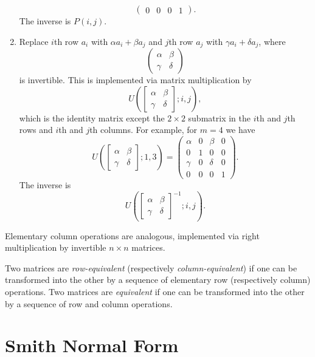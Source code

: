 \begin{enumerate}
\[\begin{pmatrix}
        0 & 0 & 0 & 1
      \end{pmatrix}.
    \]
    The inverse is $P(i, j)$.
  \item Replace $i$th row $a_i$ with
    $\alpha a_i + \beta a_j$ and $j$th row $a_j$ with
    $\gamma a_i + \delta a_j$, where
    \[
      \begin{pmatrix}
        \alpha & \beta \\
        \gamma & \delta
      \end{pmatrix}
    \]
    is invertible. This is implemented via matrix
    multiplication by
    \[
      U\left(\begin{bmatrix} \alpha & \beta \\ \gamma & \delta \end{bmatrix}; i, j\right),
    \]
    which is the identity matrix except the
    $2 \times 2$ submatrix in the $i$th and $j$th
    rows and $i$th and $j$th columns. For example, for
    $m = 4$ we have
    \[
      U\left(\begin{bmatrix} \alpha & \beta \\ \gamma & \delta \end{bmatrix}; 1, 3\right) =
      \begin{pmatrix}
        \alpha & 0 & \beta & 0 \\
        0 & 1 & 0 & 0 \\
        \gamma & 0 & \delta & 0 \\
        0 & 0 & 0 & 1
      \end{pmatrix}.
    \]
    The inverse is
    \[
      U\left(\begin{bmatrix} \alpha & \beta \\ \gamma & \delta \end{bmatrix}^{-1}; i, j\right).
    \]
\end{enumerate}
Elementary column operations are analogous, implemented
via right multiplication by invertible $n \times n$
matrices.

\begin{definition}
  Two matrices are \emph{row-equivalent} (respectively
  \emph{column-equivalent}) if one can be transformed into
  the other by a sequence of elementary row
  (respectively column) operations. Two matrices are
  \emph{equivalent} if one can be transformed into the
  other by a sequence of row and column operations.
\end{definition}

\section{Smith Normal Form}


